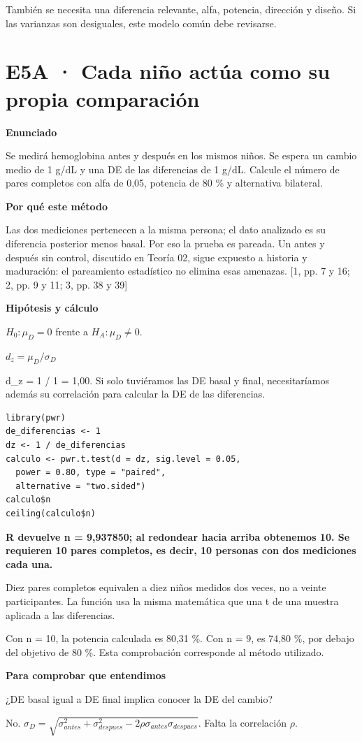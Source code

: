 \documentclass[10pt,a4paper]{article}
\newcommand{\etiqueta}[1]{\par{\bfseries\color{Blue}#1}\par}
\newcommand{\cajares}[1]{\par\colorbox{Pale}{\parbox{\dimexpr\linewidth-2\fboxsep}{\vspace{4pt}\textbf{\color{Navy}#1}\vspace{4pt}}}\par}
\begin{document}
{\small También se necesita una diferencia relevante, alfa, potencia, dirección y diseño. Si las varianzas son desiguales, este modelo común debe revisarse.}
\clearpage
\section*{E5A · Cada niño actúa como su propia comparación}
\etiqueta{Enunciado}
Se medirá hemoglobina antes y después en los mismos niños. Se espera un cambio medio de 1 g/dL y una DE de las diferencias de 1 g/dL. Calcule el número de pares completos con alfa de 0,05, potencia de 80 \% y alternativa bilateral.
\etiqueta{Por qué este método}
Las dos mediciones pertenecen a la misma persona; el dato analizado es su diferencia posterior menos basal. Por eso la prueba es pareada. Un antes y después sin control, discutido en Teoría 02, sigue expuesto a historia y maduración: el pareamiento estadístico no elimina esas amenazas. [1, pp. 7 y 16; 2, pp. 9 y 11; 3, pp. 38 y 39]
\etiqueta{Hipótesis y cálculo}
$H_0:\mu_D=0$ frente a $H_A:\mu_D\ne0$.

$d_z=\mu_D/\sigma_D$

d\_z = 1 / 1 = 1,00. Si solo tuviéramos las DE basal y final, necesitaríamos además su correlación para calcular la DE de las diferencias.
\begin{Verbatim}
library(pwr)
de_diferencias <- 1
dz <- 1 / de_diferencias
calculo <- pwr.t.test(d = dz, sig.level = 0.05,
  power = 0.80, type = "paired",
  alternative = "two.sided")
calculo$n
ceiling(calculo$n)
\end{Verbatim}
\cajares{R devuelve n = 9,937850; al redondear hacia arriba obtenemos 10. Se requieren 10 pares completos, es decir, 10 personas con dos mediciones cada una.}
Diez pares completos equivalen a diez niños medidos dos veces, no a veinte participantes. La función usa la misma matemática que una t de una muestra aplicada a las diferencias.

{\small\color{Gray}Con n = 10, la potencia calculada es 80,31 \%. Con n = 9, es 74,80 \%, por debajo del objetivo de 80 \%. Esta comprobación corresponde al método utilizado.}
\etiqueta{Para comprobar que entendimos}
¿DE basal igual a DE final implica conocer la DE del cambio?

{\small No. $\sigma_D=\sqrt{\sigma_{antes}^2+\sigma_{despues}^2-2\rho\sigma_{antes}\sigma_{despues}}$. Falta la correlación $\rho$.}
\clearpage
\end{document}
